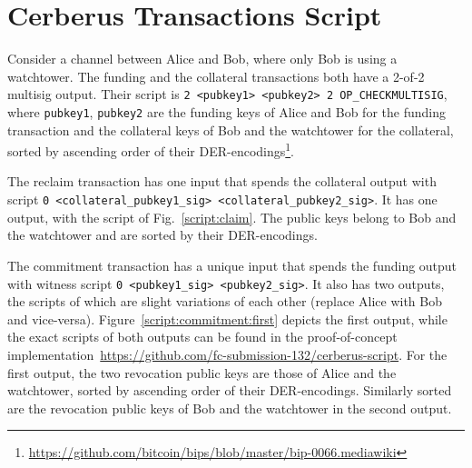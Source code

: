 \documentclass[twocolumn,showpacs,%
  nofootinbib,aps,superscriptaddress,%
  eqsecnum,prd,notitlepage,showkeys,10pt]{revtex4-1}
\begin{document}
\section{Cerberus Transactions Script}
\label{sec:script}

Consider a channel between Alice and Bob, where only Bob is using a watchtower.
The funding and the collateral transactions both have a 2-of-2 multisig output. Their script is
\texttt{2 <pubkey1> <pubkey2> 2 OP\_CHECKMULTISIG},
where \texttt{pubkey1}, \texttt{pubkey2} are the funding keys of Alice and Bob for the funding transaction and the collateral keys of Bob and the watchtower for the collateral, sorted by ascending order of their DER-encodings\footnote{\url{https://github.com/bitcoin/bips/blob/master/bip-0066.mediawiki}}.

The reclaim transaction has one input that spends the collateral output with script
\texttt{0 <collateral\_pubkey1\_sig> <collateral\_pubkey2\_sig>}.
It has one output, with the script of Fig.~\ref{script:claim}. The public keys belong to Bob and the watchtower and are sorted by their DER-encodings.


The commitment transaction has a unique input that spends the funding output with witness script \texttt{0 <pubkey1\_sig> <pubkey2\_sig>}. It also has two outputs, the scripts of which are slight variations of each other (replace Alice with Bob and vice-versa). Figure~\ref{script:commitment:first} depicts the first output, while
the exact scripts of both outputs can be found in the proof-of-concept implementation~\url{https://github.com/fc-submission-132/cerberus-script}.
For the first output, the two revocation public keys are those of Alice and the watchtower, sorted by ascending order of their DER-encodings. Similarly sorted are the revocation public keys of Bob and the watchtower in the second output.
\end{document}
